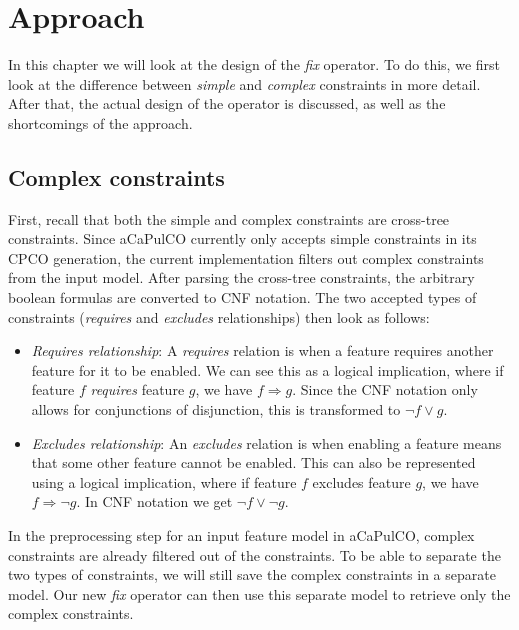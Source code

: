 \chapter{Approach}\label{ch:approach}
In this chapter we will look at the design of the \emph{fix} operator. To do
this, we first look at the difference between \emph{simple} and \emph{complex}
constraints in more detail. After that, the actual design of the operator is
discussed, as well as the shortcomings of the approach.

\section{Complex constraints}
First, recall that both the simple and complex constraints are cross-tree
constraints. Since aCaPulCO currently only accepts simple constraints in its
CPCO generation, the current implementation filters out complex constraints from the input
model. After parsing the cross-tree constraints, the arbitrary boolean formulas
are converted to CNF notation. The two accepted types of constraints 
(\emph{requires} and \emph{excludes} relationships) then look as follows:

\begin{itemize}
    \item \textit{Requires relationship}: A \emph{requires} relation is when a
          feature requires another feature for it to be enabled. We can see this
          as a logical implication, where if feature $f$ \emph{requires} feature 
          $g$, we have \( f \Rightarrow g \). Since the CNF notation only allows
          for conjunctions of disjunction, this is transformed to \( \neg f \lor g \).
    \item \textit{Excludes relationship}: An \emph{excludes} relation is when
          enabling a feature means that some other feature cannot be enabled. This
          can also be represented using a logical implication, where if feature $f$
          excludes feature $g$, we have \( f \Rightarrow \neg g \). In CNF notation
          we get \( \neg f \lor \neg g \).
\end{itemize}

In the preprocessing step for an input feature model in aCaPulCO, complex
constraints are already filtered out of the constraints. To be able to separate
the two types of constraints, we will still save the complex constraints in a
separate model. Our new \emph{fix} operator can then use this separate model to
retrieve only the complex constraints.

